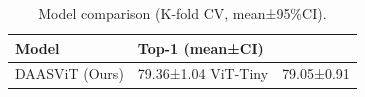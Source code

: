 \begin{table}
\caption{Model comparison (K-fold CV, mean±95\%CI).}
\label{tab:models}
\begin{tabular}{ll}
\toprule
Model & Top-1 (mean±CI) \\
\midrule
DAASViT (Ours) & 79.36±1.04%
ViT-Tiny & 79.05±0.91%
\bottomrule
\end{tabular}
\end{table}
